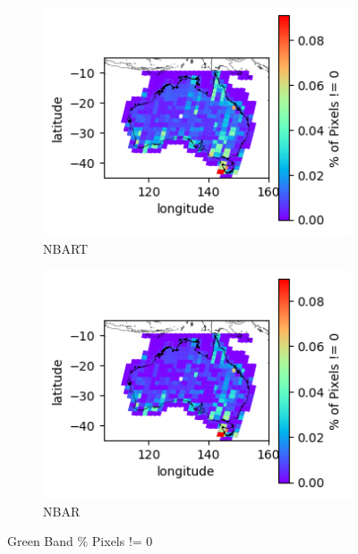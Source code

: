 \documentclass[a4paper]{article}
\begin{document}
      \begin{figure}[h!]
        \centering
          \begin{subfigure}[l]{.4\linewidth}
            \hspace{-32mm}
            \includegraphics[scale=0.9]{plots/nbart/nbart_green-PercentDifferent.png}
            \caption{NBART}
          \end{subfigure}
%
          \begin{subfigure}[r]{.4\linewidth}
            \includegraphics[scale=0.9]{plots/nbar/nbar_green-PercentDifferent.png}
            \caption{NBAR}
          \end{subfigure}
        \caption{Green Band \% Pixels != 0}\label{figure:17}
      \end{figure}
\end{document}
